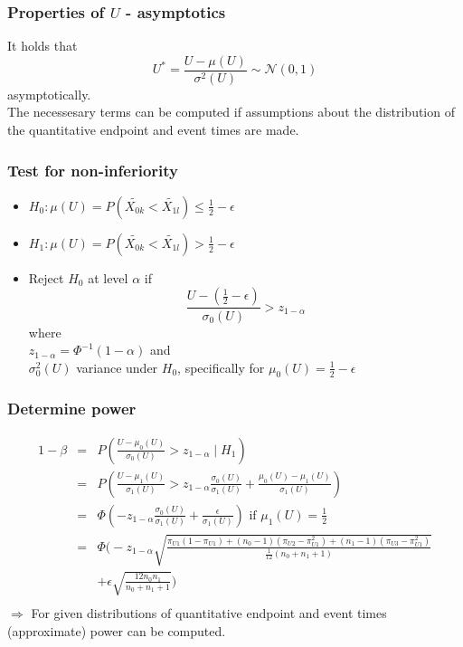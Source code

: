 \documentclass[xcolor=pdftex,dvipsnames,table]{beamer}\usepackage[]{graphicx}\usepackage[]{color}
\begin{document}
\begin{frame} %
\frametitle{Properties of $U$ - asymptotics}
It holds that
  $$ U^{*} = \frac{U - \mu(U)}{\sigma^2(U)} \sim \mathcal{N} (0, 1)$$ asymptotically.\\
\vspace{0.5cm}
The necessesary terms can be computed if assumptions about the distribution of the quantitative endpoint and 
event times are made.
\end{frame}

\begin{frame} %
\frametitle{Test for non-inferiority}
\begin{itemize}
  \item $H_0:  
  \mu(U) = P(\tilde{X_{0k}} < \tilde{X_{1l}}) \leq \frac{1}{2} - \epsilon$ \\
  \item $H_1:  \mu(U) = P(\tilde{X_{0k}} < \tilde{X_{1l}}) > \frac{1}{2} - \epsilon $ \\
  \item Reject $H_0$ at level $\alpha$ if
        $$ \frac{U - (\frac{1}{2}- \epsilon)}{\sigma_0(U)}  > z_{1-\alpha} $$ 
        where \\
        $z_{1-\alpha} = \Phi^{-1}({1-\alpha})$ and \\
        $\sigma_0^2(U)$  variance under $H_0$, specifically for 
        $ \mu_0(U) =  \frac{1}{2} - \epsilon$ 
\end{itemize}
\end{frame}

\begin{frame} %
\frametitle{Determine power}
\begin{eqnarray*}
  1 - \beta & = & P(\frac{U - \mu_0(U)}{\sigma_0(U)}  > z_{1-\alpha} \mid H_1) \\
            & = & P \left(\frac{U - \mu_1(U)}{\sigma_1(U)}  > z_{1-\alpha}\frac{\sigma_0(U)}{\sigma_1(U)} + 
                    \frac{\mu_0(U) - \mu_1(U)}{\sigma_1(U)} \right) \\
            & = & \Phi\left(- z_{1-\alpha}\frac{\sigma_0(U)}{\sigma_1(U)} + \frac{\epsilon}{\sigma_1(U)}\right) \mbox{ if } \mu_1(U) = \frac{1}{2}\\
            & = & \Phi\bigg(- z_{1-\alpha} \textstyle \sqrt{\frac{\pi_{U1} (1 - \pi_{U1}) + (n_0 - 1) (\pi_{U2} - \pi_{U1}^2) + (n_1 - 1) (\pi_{U3} - \pi_{U1}^2)}{\frac{1}{12}(n_0 + n_1 + 1)}}  \\
            &   & + \epsilon \textstyle \sqrt{\frac{12 n_0 n_1}{n_0 + n_1 + 1}}
            \bigg) \\
\end{eqnarray*}
$\Rightarrow$ For given distributions of quantitative endpoint and event times (approximate) power can be computed.
\end{frame}
\end{document}

